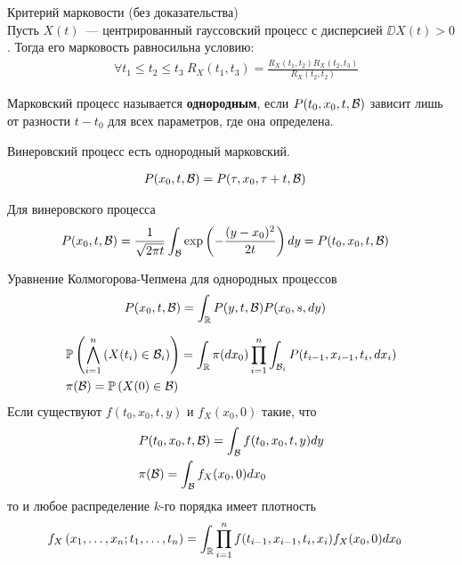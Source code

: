 \begin{theorem} Критерий марковости (без доказательства)
    \\
    Пусть $X(t)$~--- центрированный гауссовский процесс с дисперсией $\DD X(t) >
    0$. Тогда его марковость равносильна условию:
    \begin{align*}
      & \forall t_1 \leq t_2 \leq t_3 \ R_X(t_1, t_3) = \frac{R_X(t_1,t_2)R_X(t_2,t_3)}{R_X(t_2,t_2)}
    \end{align*}
\end{theorem}
\begin{Def}
    Марковский процесс называется \textbf{однородным}, если $P(t_0,x_0,t, \mathcal{B})$
    зависит лишь  от разности $t-t_0$ для всех параметров, где она определена.
\end{Def}
\begin{example}
    Винеровский процесс есть однородный марковский.
\end{example}
\begin{Des}
    \begin{align*}
      & P(x_0, t, \mathcal{B}) = P(\tau, x_0, \tau+t, \mathcal{B})
    \end{align*}
\end{Des}
\begin{example}
    Для винеровского процесса
    \begin{align*}
      & P(x_0, t, \mathcal{B}) = \frac{1}{\sqrt{2\pi t}} \int_{\mathcal{B}}\exp\left( -\frac{(y-x_0)^2}{2t} \right) dy = P(t_0, x_0, t, \mathcal{B})
    \end{align*}
\end{example}
\begin{theorem} Уравнение Колмогорова-Чепмена для однородных процессов
    \begin{align*}
      & P(x_0, t, \mathcal{B}) = \int_{\mathbb{R}} P(y,t,\mathcal{B})P(x_0, s, dy)
    \end{align*}
\end{theorem}
\begin{Prop}
    \begin{align*}
      & \mathbb{P}\left( \bigwedge_{i=1}^n \left( X(t_i) \in \mathcal{B}_i \right) \right) = \int_{\mathbb{R}}\pi(dx_0) \prod_{i=1}^n\int_{\mathcal{B}_i} P(t_{i-1},x_{i-1},t_i,dx_i) \\
      & \pi(\mathcal{B}) = \mathbb{P}\left( X(0) \in \mathcal{B} \right)
    \end{align*}
    Если существуют $f(t_0, x_0, t, y)$  и $f_X(x_0,0)$ такие, что
    \begin{align*}
      & P(t_0, x_0, t, \mathcal{B}) = \int_{\mathcal{B}} f(t_0,x_0,t,y)dy \\
      & \pi(\mathcal{B}) = \int_{\mathcal{B}} f_X(x_0,0)dx_0
    \end{align*}
    то и любое распределение $k$-го порядка имеет плотность
    \begin{align*}
      & f_X\left( x_1, \dots, x_n; t_1, \dots, t_n\right) = \int_{\mathbb{R}} \prod_{i=1}^n f(t_{i-1}, x_{i-1}, t_i, x_i) f_X(x_0, 0) dx_0
    \end{align*}  
\end{Prop}

